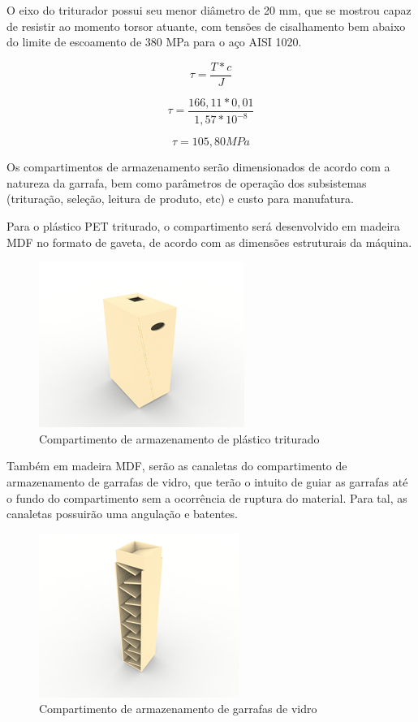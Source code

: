 O eixo do triturador possui seu menor diâmetro de 20 mm, que se mostrou capaz de resistir ao momento torsor atuante, com tensões de cisalhamento bem abaixo do limite de escoamento de 380 MPa para o aço AISI 1020.

\begin{equation}
    \tau = \frac{T \ast c}{J}
\end{equation}

\begin{equation}
    \tau = \frac{166,11 \ast 0,01}{1,57 \ast 10^{-8}}
\end{equation}

\begin{equation}
    \tau = 105,80 MPa
\end{equation}

Os compartimentos de armazenamento serão dimensionados de acordo com a natureza da garrafa, bem como parâmetros de operação dos subsistemas (trituração, seleção, leitura de produto, etc) e custo para manufatura.

Para o plástico PET triturado, o compartimento será desenvolvido em madeira MDF no formato de gaveta, de acordo com as dimensões estruturais da máquina.


\begin{figure}[!h]
	\centering
		\includegraphics[scale=0.4]{figuras/estrutura/22.png}
	\caption{Compartimento de armazenamento de plástico triturado}
\end{figure}

Também em madeira MDF, serão as canaletas do compartimento de armazenamento de garrafas de vidro, que terão o intuito de guiar as garrafas até o fundo do compartimento sem a ocorrência de ruptura do material. Para tal, as canaletas possuirão uma angulação e batentes. 

\begin{figure}[!h]
	\centering
		\includegraphics[scale=0.4]{figuras/estrutura/23.png}
	\caption{Compartimento de armazenamento de garrafas de vidro}
\end{figure}

